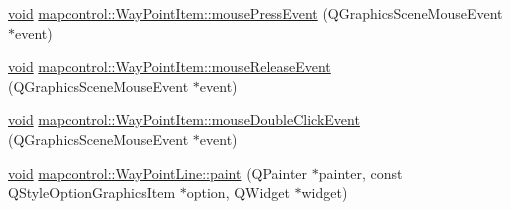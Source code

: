 \begin{DoxyCompactItemize}
\item 
\hyperlink{group___u_a_v_objects_plugin_ga444cf2ff3f0ecbe028adce838d373f5c}{void} \hyperlink{group___o_p_map_widget_ga75c88df34476dc60c89f8611fec5868b}{mapcontrol\-::\-Way\-Point\-Item\-::mouse\-Press\-Event} (\-Q\-Graphics\-Scene\-Mouse\-Event $\ast$event)
\item 
\hyperlink{group___u_a_v_objects_plugin_ga444cf2ff3f0ecbe028adce838d373f5c}{void} \hyperlink{group___o_p_map_widget_gab66a8c1572009dbf0caad4c9a0109cfa}{mapcontrol\-::\-Way\-Point\-Item\-::mouse\-Release\-Event} (\-Q\-Graphics\-Scene\-Mouse\-Event $\ast$event)
\item 
\hyperlink{group___u_a_v_objects_plugin_ga444cf2ff3f0ecbe028adce838d373f5c}{void} \hyperlink{group___o_p_map_widget_ga8e95fece0c41ca37ee7878e84a03e700}{mapcontrol\-::\-Way\-Point\-Item\-::mouse\-Double\-Click\-Event} (\-Q\-Graphics\-Scene\-Mouse\-Event $\ast$event)
\item 
\hyperlink{group___u_a_v_objects_plugin_ga444cf2ff3f0ecbe028adce838d373f5c}{void} \hyperlink{group___o_p_map_widget_ga7e02fb7136fabae7e6ffe0e8db29e747}{mapcontrol\-::\-Way\-Point\-Line\-::paint} (\-Q\-Painter $\ast$painter, const \-Q\-Style\-Option\-Graphics\-Item $\ast$option, \-Q\-Widget $\ast$widget)
\end{DoxyCompactItemize}
